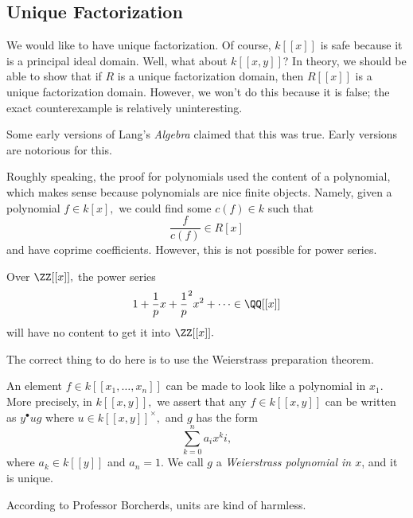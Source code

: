 \subsection{Unique Factorization}
We would like to have unique factorization. Of course, $k[[x]]$ is safe because it is a principal ideal domain. Well, what about $k[[x,y]]$? In theory, we should be able to show that if $R$ is a unique factorization domain, then $R[[x]]$ is a unique factorization domain. However, we won't do this because it is false; the exact counterexample is relatively uninteresting.
\begin{remark}
	Some early versions of Lang's \textit{Algebra} claimed that this was true. Early versions are notorious for this.
\end{remark}
Roughly speaking, the proof for polynomials used the content of a polynomial, which makes sense because polynomials are nice finite objects. Namely, given a polynomial $f\in k[x],$ we could find some $c(f)\in k$ such that
\[\frac f{c(f)}\in R[x]\]
and have coprime coefficients. However, this is not possible for power series.
\begin{example}
	Over $\ZZ[[x]],$ the power series
	\[1+\frac1px+\frac1p^2x^2+\cdots\in\QQ[[x]]\]
	will have no content to get it into $\ZZ[[x]].$
\end{example}
The correct thing to do here is to use the Weierstrass preparation theorem.
\begin{theorem}
	An element $f\in k[[x_1,\ldots,x_n]]$ can be made to look like a polynomial in $x_1.$ More precisely, in $k[[x,y]],$ we assert that any $f\in k[[x,y]]$ can be written as $y^\bullet ug$ where $u\in k[[x,y]]^\times,$ and $g$ has the form
	\[\sum_{k=0}^na_ix^ki,\]
	where $a_k\in k[[y]]$ and $a_n=1.$ We call $g$ a \textit{Weierstrass polynomial in $x$}, and it is unique.
\end{theorem}
\begin{remark}
	According to Professor Borcherds, units are kind of harmless.
\end{remark}
